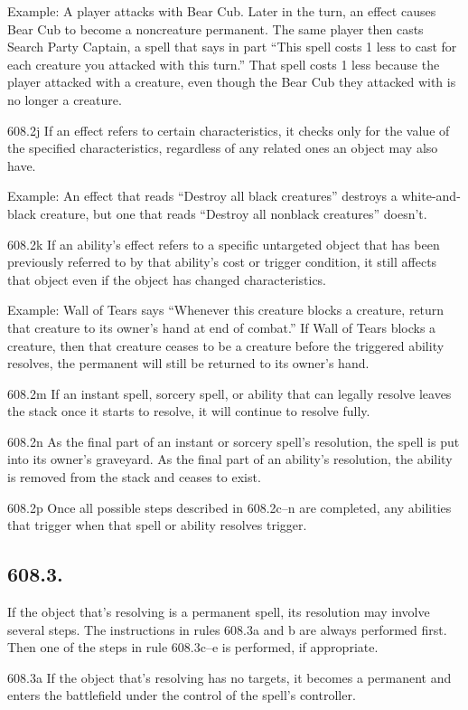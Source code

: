Example: A player attacks with Bear Cub. Later in the turn, an effect causes Bear Cub to become a noncreature permanent. The same player then casts Search Party Captain, a spell that says in part “This spell costs {1} less to cast for each creature you attacked with this turn.” That spell costs {1} less because the player attacked with a creature, even though the Bear Cub they attacked with is no longer a creature.

608.2j If an effect refers to certain characteristics, it checks only for the value of the specified characteristics, regardless of any related ones an object may also have.

Example: An effect that reads “Destroy all black creatures” destroys a white-and-black creature, but one that reads “Destroy all nonblack creatures” doesn’t.

608.2k If an ability’s effect refers to a specific untargeted object that has been previously referred to by that ability’s cost or trigger condition, it still affects that object even if the object has changed characteristics.

Example: Wall of Tears says “Whenever this creature blocks a creature, return that creature to its owner’s hand at end of combat.” If Wall of Tears blocks a creature, then that creature ceases to be a creature before the triggered ability resolves, the permanent will still be returned to its owner’s hand.

608.2m If an instant spell, sorcery spell, or ability that can legally resolve leaves the stack once it starts to resolve, it will continue to resolve fully.

608.2n As the final part of an instant or sorcery spell’s resolution, the spell is put into its owner’s graveyard. As the final part of an ability’s resolution, the ability is removed from the stack and ceases to exist.

608.2p Once all possible steps described in 608.2c–n are completed, any abilities that trigger when that spell or ability resolves trigger.

\subsection*{608.3.}
If the object that’s resolving is a permanent spell, its resolution may involve several steps. The instructions in rules 608.3a and b are always performed first. Then one of the steps in rule 608.3c–e is performed, if appropriate.

608.3a If the object that’s resolving has no targets, it becomes a permanent and enters the battlefield under the control of the spell’s controller.

